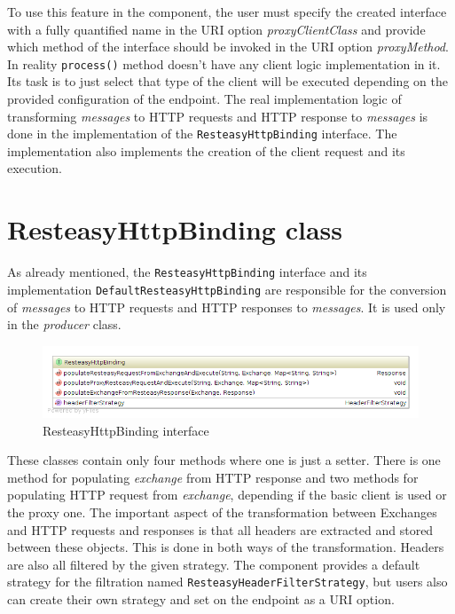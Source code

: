 \documentclass[12pt,final,oneside]{fithesis2}
\begin{document}
To use this feature in the component, the user must specify the created interface with a fully quantified name in the URI option \textit{proxyClientClass} and provide which method of the interface should be invoked in the URI option \textit{proxyMethod}. In reality \texttt{process()} method doesn't have any client logic implementation in it. Its task is to just select that type of the client will be executed depending on the provided configuration of the endpoint. The real implementation logic of transforming \textit{messages} to HTTP requests and HTTP response to \textit{messages} is done in the implementation of the \texttt{ResteasyHttpBinding} interface. The implementation also implements the creation of the client request and its execution.




\section{ResteasyHttpBinding class}
As already mentioned, the \texttt{ResteasyHttpBinding} interface and its implementation \texttt{DefaultResteasyHttpBinding} are responsible for the conversion of \textit{messages} to HTTP requests and HTTP responses to \textit{messages}. It is used only in the \textit{producer} class. 

\begin{figure}[!h]
\centering
\includegraphics[width=1.0\linewidth]{images/binding.png}
\caption{ResteasyHttpBinding interface}
\label{comp}
\end{figure}


These classes contain only four methods where one is just a setter. There is one method for populating \textit{exchange} from HTTP response and two methods for populating HTTP request from \textit{exchange}, depending if the basic client is used or the proxy one. The important aspect of the transformation between Exchanges and HTTP requests and responses is that all headers are extracted and stored between these objects. This is done in both ways of the transformation. Headers are also all filtered by the given strategy. The component provides a default strategy for the filtration named \texttt{ResteasyHeaderFilterStrategy}, but users also can create their own strategy and set on the endpoint as a URI option.
\end{document}

